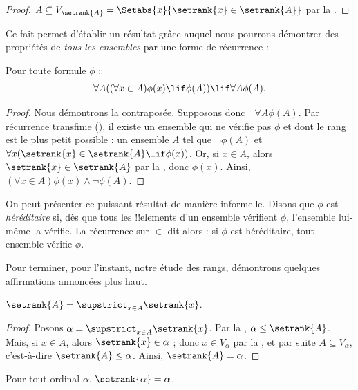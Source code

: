 \documentclass[../../../include/open-logic-section]{subfiles}
\begin{document}
\begin{proof}
$A \subseteq V_{\setrank{A}} =
\Setabs{x}{\setrank{x} \in \setrank{A}}$ par la
.
\end{proof}
\noindent
Ce fait permet d'établir un résultat grâce auquel nous pourrons
démontrer des propriétés de \emph{tous les ensembles} par une forme
de récurrence :

\begin{thm}
Pour toute formule $\phi$ :
\[
	\forall A((\forall x \in A)\phi(x) \lif \phi(A)) \lif \forall A \phi(A).
\]
\end{thm}

\begin{proof}
Nous démontrons la contraposée. Supposons donc
$\lnot \forall A \phi(A)$. Par récurrence transfinie
(), il existe un ensemble
qui ne vérifie pas $\phi$ et dont le rang est le plus petit possible :
un ensemble $A$ tel que $\lnot \phi(A)$ et
$\forall x(\setrank{x} \in \setrank{A} \lif \phi(x))$. Or, si
$x \in A$, alors $\setrank{x} \in \setrank{A}$ par la
, donc $\phi(x)$. Ainsi,
$(\forall x \in A)\phi(x) \land \lnot \phi(A)$.
\end{proof}\noindent On peut présenter ce puissant résultat de manière
informelle. Disons que $\phi$ est \emph{héréditaire} si, dès que tous
les !!{element}s d'un ensemble vérifient $\phi$, l'ensemble lui-même
la vérifie. La récurrence sur $\in$ dit alors : si $\phi$ est
héréditaire, tout ensemble vérifie $\phi$.

Pour terminer, pour l'instant, notre étude des rangs, démontrons
quelques affirmations annoncées plus haut.

\begin{prop}
$\setrank{A} = \supstrict_{x \in A}\setrank{x}$.
\end{prop}

\begin{proof}
Posons $\alpha = \supstrict_{x \in A}\setrank{x}$. Par la
, $\alpha \leq \setrank{A}$. Mais, si
$x \in A$, alors $\setrank{x} \in \alpha$ ; donc
$x \in V_\alpha$ par la , et par suite
$A \subseteq V_\alpha$, c'est-à-dire
$\setrank{A} \leq \alpha$. Ainsi, $\setrank{A} = \alpha$.
\end{proof}

\begin{cor}
Pour tout ordinal $\alpha$, $\setrank{\alpha} = \alpha$.
\end{cor}
\end{document}
